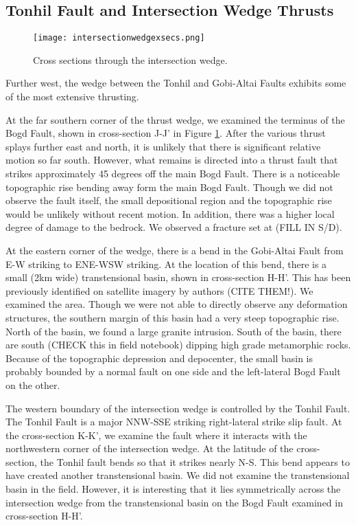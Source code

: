 \documentclass[10pt,a4paper]{article}
\begin{document}
\subsection{Tonhil Fault and Intersection Wedge Thrusts}
\begin{figure}[h!]
  \centering
  \texttt{[image: intersectionwedgexsecs.png]}
  \caption{Cross sections through the intersection wedge.}
  \label{intersectionwedgexsecs}
\end{figure}

Further west, the wedge between the Tonhil and Gobi-Altai Faults exhibits some of the most extensive thrusting. 

At the far southern corner of the thrust wedge, we examined the terminus of the Bogd Fault, shown in cross-section J-J' in Figure \ref{intersectionwedgexsecs}. After the various thrust splays further east and north, it is unlikely that there is significant relative motion so far south. However, what remains is directed into a thrust fault that strikes approximately 45 degrees off the main Bogd Fault. There is a noticeable topographic rise bending away form the main Bogd Fault. Though we did not observe the fault itself, the small depositional region and the topographic rise would be unlikely without recent motion. In addition, there was a higher local degree of damage to the bedrock. We observed a fracture set at (FILL IN S/D). 

At the eastern corner of the wedge, there is a bend in the Gobi-Altai Fault from E-W striking to ENE-WSW striking. At the location of this bend, there is a small (2km wide) transtensional basin, shown in cross-section H-H'. This has been previously identified on satellite imagery by authors (CITE THEM!). We examined the area. Though we were not able to directly observe any deformation structures, the southern margin of this basin had a very steep topographic rise. North of the basin, we found a large granite intrusion. South of the basin, there are south (CHECK this in field notebook) dipping high grade metamorphic rocks. Because of the topographic depression and depocenter, the small basin is probably bounded by a normal fault on one side and the left-lateral Bogd Fault on the other. 

The western boundary of the intersection wedge is controlled by the Tonhil Fault. The Tonhil Fault is a major NNW-SSE striking right-lateral strike slip fault. At the cross-section K-K', we examine the fault where it interacts with the northwestern corner of the intersection wedge. At the latitude of the cross-section, the Tonhil fault bends so that it strikes nearly N-S. This bend appears to have created another transtensional basin. We did not examine the transtensional basin in the field. However, it is interesting that it lies symmetrically across the intersection wedge from the transtensional basin on the Bogd Fault examined in cross-section H-H'. 
\end{document}

